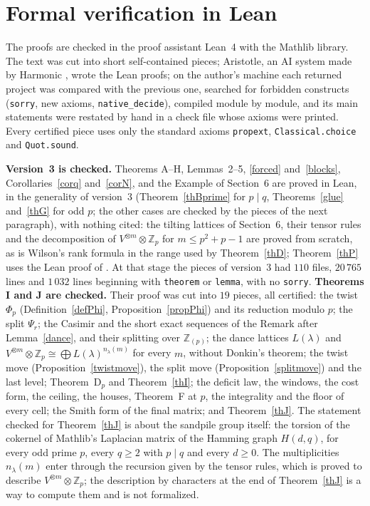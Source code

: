 \documentclass[10pt]{article}
\theoremstyle{ds}
\theoremstyle{dsrem}
\newcommand{\Z}{\mathbb{Z}}
\begin{document}
\section{Formal verification in Lean}\label{sec:lean}

The proofs are checked in the proof assistant Lean~4 with the Mathlib library. The text was cut into short self-contained pieces; Aristotle, an AI system made by Harmonic \cite{Har}, wrote the Lean proofs; on the author's machine each returned project was compared with the previous one, searched for forbidden constructs (\texttt{sorry}, new axioms, \texttt{native\_decide}), compiled module by module, and its main statements were restated by hand in a check file whose axioms were printed. Every certified piece uses only the standard axioms \texttt{propext}, \texttt{Classical.choice} and \texttt{Quot.sound}.

\textbf{Version~3 is checked.} Theorems A--H, Lemmas~2--5, \ref{forced} and~\ref{blocks}, Corollaries~\ref{corq} and~\ref{corN}, and the Example of Section~6 are proved in Lean, in the generality of version~3 (Theorem~\ref{thBprime} for $p\mid q$, Theorems~\ref{glue} and~\ref{thG} for odd $p$; the other cases are checked by the pieces of the next paragraph), with nothing cited: the tilting lattices of Section~6, their tensor rules and the decomposition of $V^{\otimes m}\otimes\Z_p$ for $m\le p^2+p-1$ are proved from scratch, as is Wilson's rank formula in the range used by Theorem~\ref{thD}; Theorem~\ref{thP} uses the Lean proof of \cite{DST}. At that stage the pieces of version~3 had $110$ files, $20\,765$ lines and $1\,032$ lines beginning with \texttt{theorem} or \texttt{lemma}, with no \texttt{sorry}.
\textbf{Theorems I and J are checked.} Their proof was cut into $19$ pieces, all certified: the twist $\Phi_p$ (Definition~\ref{defPhi}, Proposition~\ref{propPhi}) and its reduction modulo $p$; the split $\Psi_r$; the Casimir and the short exact sequences of the Remark after Lemma~\ref{dance}, and their splitting over $\Z_{(p)}$; the dance lattices $L(\lambda)$ and $V^{\otimes m}\otimes\Z_p\cong\bigoplus L(\lambda)^{n_\lambda(m)}$ for every $m$, without Donkin's theorem; the twist move (Proposition~\ref{twistmove}), the split move (Proposition~\ref{splitmove}) and the last level; Theorem~D$_p$ and Theorem~\ref{thI}; the deficit law, the windows, the cost form, the ceiling, the houses, Theorem~F at $p$, the integrality and the floor of every cell; the Smith form of the final matrix; and Theorem~\ref{thJ}. The statement checked for Theorem~\ref{thJ} is about the sandpile group itself: the torsion of the cokernel of Mathlib's Laplacian matrix of the Hamming graph $H(d,q)$, for every odd prime $p$, every $q\ge2$ with $p\mid q$ and every $d\ge0$. The multiplicities $n_\lambda(m)$ enter through the recursion given by the tensor rules, which is proved to describe $V^{\otimes m}\otimes\Z_p$; the description by characters at the end of Theorem~\ref{thJ} is a way to compute them and is not formalized.
\end{document}
